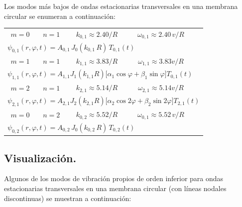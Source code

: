 Los modos más bajos de ondas estacionarias transversales en una membrana circular se enumeran a continuación:
\begin{table}[H]
\centering
\large
\begin{tabular}{c c c c l}
$m {=} 0$ & $n {=} 1$ & $k_{0,1} {\approx} 2.40/R$ & $\omega_{0,1} {\approx} 2.40 \, v/R$ & \\[0.5em] 
\multicolumn{5}{l}{$\psi_{0,1}(r, \varphi, t) {=} A_{0,1} \, J_{0}(k_{0,1} \, R) \, T_{0,1}(t)$} \\[0.5em] \hline 
$m {=} 1$ & $n {=} 1$ & $k_{1,1} {\approx} 3.83/R$ & $\omega_{1,1} {\approx} 3.83 v/R$ & \\[0.5em]
\multicolumn{5}{l}{$\psi_{1,1}(r, \varphi, t) {=} A_{1,1} J_{1}(k_{1,1} R) \big[ \alpha_{1} \cos \varphi {+} \beta_{1} \sin \varphi \big] T_{0,1}(t)$} \\[0.5em] \hline 
$m {=} 2$ & $n {=} 1$ & $k_{2,1} {\approx} 5.14/R$ & $\omega_{2,1} {\approx} 5.14 v/R$ & \\[0.5em]
\multicolumn{5}{l}{$\psi_{2,1}(r, \varphi, t) {=} A_{2,1} J_{2}(k_{2,1} R) \big[ \alpha_{2} \cos 2 \varphi {+} \beta_{2} \sin 2 \varphi \big] T_{2,1}(t)$} \\[0.5em] \hline
$m {=} 0$ & $n {=} 2$ & $k_{0,2} {\approx} 5.52/R$ & $\omega_{0,1} {\approx} 5.52 \, v/R$ & \\[0.5em]
\multicolumn{5}{l}{$\psi_{0,2}(r, \varphi, t) {=} A_{0,2} \, J_{0}(k_{0,2} \, R) \, T_{0,2}(t)$}
\end{tabular}
\end{table}

\subsection{Visualización.}

Algunos de los modos de vibración propios de orden inferior para ondas estacionarias transversales en una membrana circular (con líneas nodales discontinuas) se muestran a continuación:

